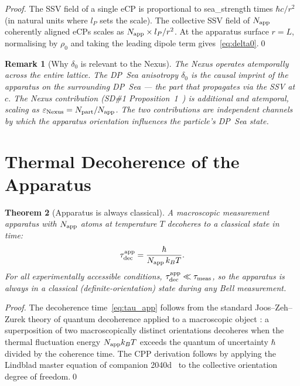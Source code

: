 \documentclass[11pt,letterpaper]{article}
\newtheorem{theorem}{Theorem}[section]
\newtheorem{remark}[theorem]{Remark}
\newcommand{\lP}{l_P}
\newcommand{\eps}{\varepsilon}
\begin{document}
\begin{proof}
The SSV field of a single eCP is proportional to sea\_strength
times $\hbar c / r^2$ (in natural units where $\lP$ sets the
scale).  The collective SSV field of $N_{\rm app}$ coherently
aligned eCPs scales as $N_{\rm app} \times \lP/r^2$.
At the apparatus surface $r = L$, normalising by $\rho_0$ and
taking the leading dipole term gives~\eqref{eq:delta0}.\qed
\end{proof}

\begin{remark}[Why $\delta_0$ is relevant to the Nexus]
The Nexus operates atemporally across the entire lattice.  The
DP~Sea anisotropy $\delta_0$ is the \emph{causal} imprint of the
apparatus on the surrounding DP~Sea --- the part that propagates
via the SSV at $c$.  The Nexus contribution (SD\#1
Proposition~1~\citep{cpp_sd1}) is additional and atemporal,
scaling as $\eps_{\rm Nexus} = N_{\rm part}/N_{\rm app}$.  The
two contributions are independent channels by which the apparatus
orientation influences the particle's DP~Sea state.
\end{remark}

\section{Thermal Decoherence of the Apparatus}
\label{sec:decoherence_app}

\begin{theorem}[Apparatus is always classical]
\label{thm:classical}
A macroscopic measurement apparatus with $N_{\rm app}$ atoms at
temperature $T$ decoheres to a classical state in time:
\begin{equation}
\tau_{\rm dec}^{\rm app} = \frac{\hbar}{N_{\rm app}\,k_B T}.
\label{eq:tau_app}
\end{equation}
For all experimentally accessible conditions,
$\tau_{\rm dec}^{\rm app} \ll \tau_{\rm meas}$, so the apparatus
is always in a classical (definite-orientation) state during any
Bell measurement.
\end{theorem}

\begin{proof}
The decoherence time~\eqref{eq:tau_app} follows from the standard
Joos--Zeh--Zurek theory of quantum decoherence applied to a
macroscopic object \citep{joos1985,zurek1991}: a superposition of
two macroscopically distinct orientations decoheres when the
thermal fluctuation energy $N_{\rm app} k_B T$ exceeds the quantum
of uncertainty $\hbar$ divided by the coherence time.  The CPP
derivation follows by applying the Lindblad master equation of
companion 2040d~\citep{cpp2040d} to the collective orientation
degree of freedom.\qed
\end{proof}
\end{document}
